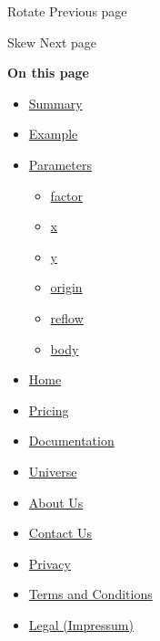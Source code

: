 \href{/docs/reference/layout/rotate/}{\pandocbounded{}}

{ Rotate } { Previous page }

\href{/docs/reference/layout/skew/}{\pandocbounded{}}

{ Skew } { Next page }

\textbf{On this page}

\begin{itemize}
\tightlist
\item
  \hyperref[summary]{Summary}
\item
  \hyperref[example]{Example}
\item
  \hyperref[parameters]{Parameters}

  \begin{itemize}
  \tightlist
  \item
    \hyperref[parameters-factor]{factor}
  \item
    \hyperref[parameters-x]{x}
  \item
    \hyperref[parameters-y]{y}
  \item
    \hyperref[parameters-origin]{origin}
  \item
    \hyperref[parameters-reflow]{reflow}
  \item
    \hyperref[parameters-body]{body}
  \end{itemize}
\end{itemize}

\begin{itemize}
\tightlist
\item
  \href{/}{Home}
\item
  \href{/pricing/}{Pricing}
\item
  \href{/docs/}{Documentation}
\item
  \href{/universe/}{Universe}
\item
  \href{/about/}{About Us}
\item
  \href{/contact/}{Contact Us}
\item
  \href{/privacy/}{Privacy}
\item
  \href{https://typst.app/terms}{Terms and Conditions}
\item
  \href{/legal/}{Legal (Impressum)}
\end{itemize}

